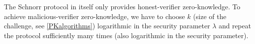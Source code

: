 The Schnorr protocol in itself only provides honest-verifier zero-knowledge.
To achieve malicious-verifier zero-knowledge, we have to choose \(k\) (size of 
the challenge, see \cref{PKalgorithms}) logarithmic in the security parameter 
\(\lambda\) and repeat the protocol sufficiently many times (also logarithmic in 
the security parameter).

%
%

